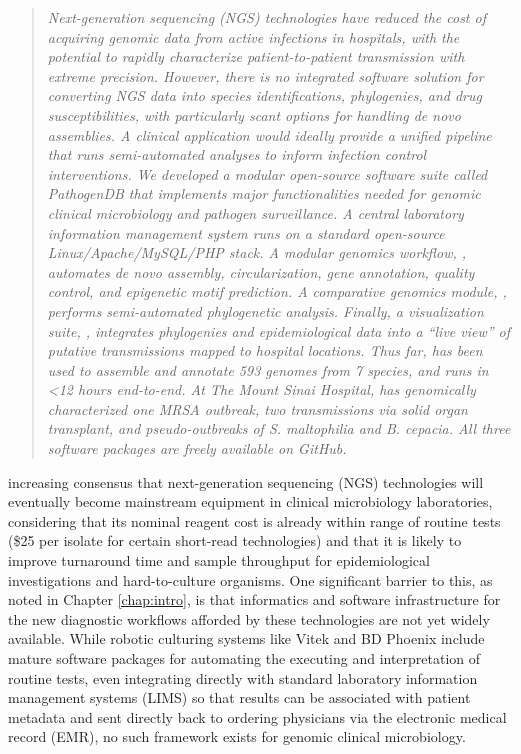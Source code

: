 \begin{quote}
\emph{Next-generation sequencing (NGS) technologies have reduced the cost of acquiring genomic data from active infections in hospitals, with the potential to rapidly characterize patient-to-patient transmission with extreme precision. However, there is no integrated software solution for converting NGS data into species identifications, phylogenies, and drug susceptibilities, with particularly scant options for handling \emph{de novo} assemblies. A clinical application would ideally provide a unified pipeline that runs semi-automated analyses to inform infection control interventions. We developed a modular open-source software suite called PathogenDB that implements major functionalities needed for genomic clinical microbiology and pathogen surveillance. A central laboratory information management system runs on a standard open-source Linux/Apache/MySQL/PHP stack. A modular genomics workflow, \pathogendbpipeline, automates de novo assembly, circularization, gene annotation, quality control, and epigenetic motif prediction. A comparative genomics module, \pathogendbcomparison, performs semi-automated phylogenetic analysis. Finally, a visualization suite, \pathogendbviz, integrates phylogenies and epidemiological data into a ``live view'' of putative transmissions mapped to hospital locations. Thus far, \pathogendbpipeline{} has been used to assemble and annotate 593 genomes from 7 species, and runs in <12 hours end-to-end. At The Mount Sinai Hospital, \pathogendbcomparison{} has genomically characterized one MRSA outbreak, two transmissions via solid organ transplant, and pseudo-outbreaks of \emph{S. maltophilia} and \emph{B. cepacia}. All three software packages are freely available on GitHub.
}
\end{quote}

 increasing consensus that next-generation sequencing (NGS) technologies will eventually become mainstream equipment in clinical microbiology laboratories, considering that its nominal reagent cost is already within range of routine tests (\$25 per isolate for certain short-read technologies) and that it is likely to improve turnaround time and sample throughput for epidemiological investigations and hard-to-culture organisms.\autocite{Didelot2012,Koser2012} One significant barrier to this, as noted in Chapter \ref{chap:intro}, is that informatics and software infrastructure for the new diagnostic workflows afforded by these technologies are not yet widely available. While robotic culturing systems like Vitek and BD Phoenix include mature software packages for automating the executing and interpretation of routine tests, even integrating directly with standard laboratory information management systems (LIMS) so that results can be associated with patient metadata and sent directly back to ordering physicians via the electronic medical record (EMR), no such framework exists for genomic clinical microbiology.


